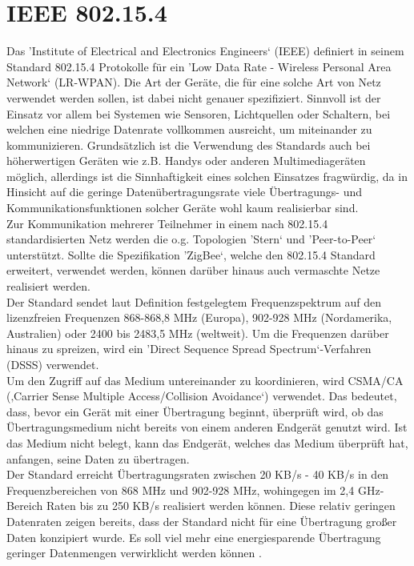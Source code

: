 \section{IEEE 802.15.4}\label{ss:IEEE802154}

Das 'Institute of Electrical and Electronics Engineers‘ (IEEE) definiert in seinem Standard 802.15.4 Protokolle für ein 'Low Data Rate - Wireless Personal Area Network‘ (LR-WPAN). Die Art der Geräte, die für eine solche Art von Netz verwendet werden sollen, ist dabei nicht genauer spezifiziert. Sinnvoll ist der Einsatz vor allem bei Systemen wie Sensoren, Lichtquellen oder Schaltern, bei welchen eine niedrige Datenrate vollkommen ausreicht, um miteinander zu kommunizieren. Grundsätzlich ist die Verwendung des Standards auch bei höherwertigen Geräten wie z.B. Handys oder anderen Multimediageräten möglich, allerdings ist die Sinnhaftigkeit eines solchen Einsatzes fragwürdig, da in Hinsicht auf die geringe Datenübertragungsrate viele Übertragungs- und Kommunikationsfunktionen solcher Geräte wohl kaum realisierbar sind. \\
Zur Kommunikation mehrerer Teilnehmer in einem nach 802.15.4 standardisierten Netz werden die o.g. Topologien 'Stern‘ und 'Peer-to-Peer‘ unterstützt. Sollte die Spezifikation 'ZigBee‘,  welche den 802.15.4 Standard erweitert, verwendet werden, können darüber hinaus auch vermaschte Netze realisiert werden. \\
Der Standard sendet laut Definition festgelegtem Frequenzspektrum auf den lizenzfreien Frequenzen 868-868,8 MHz (Europa), 902-928 MHz (Nordamerika, Australien) oder 2400 bis 2483,5 MHz (weltweit). Um die Frequenzen darüber hinaus zu spreizen, wird ein 'Direct Sequence Spread Spectrum‘-Verfahren (DSSS) verwendet.\\ 
Um den Zugriff auf das Medium untereinander zu koordinieren, wird CSMA/CA (‚Carrier Sense Multiple Access/Collision Avoidance‘) verwendet. Das bedeutet, dass, bevor ein Gerät mit einer Übertragung beginnt, überprüft wird, ob das Übertragungsmedium nicht bereits von einem anderen Endgerät genutzt wird. Ist das Medium nicht belegt, kann das Endgerät, welches das Medium überprüft hat, anfangen, seine Daten zu übertragen.\\
Der Standard erreicht Übertragungsraten zwischen 20 KB/s - 40 KB/s in den Frequenzbereichen von 868 MHz und 902-928 MHz, wohingegen im 2,4 GHz-Bereich Raten bis zu 250 KB/s realisiert werden können. Diese relativ geringen Datenraten zeigen bereits, dass der Standard nicht für eine Übertragung großer Daten konzipiert wurde. Es soll viel mehr eine energiesparende Übertragung geringer Datenmengen verwirklicht werden können \cite{d:hesse} \cite{d:ieee}.

